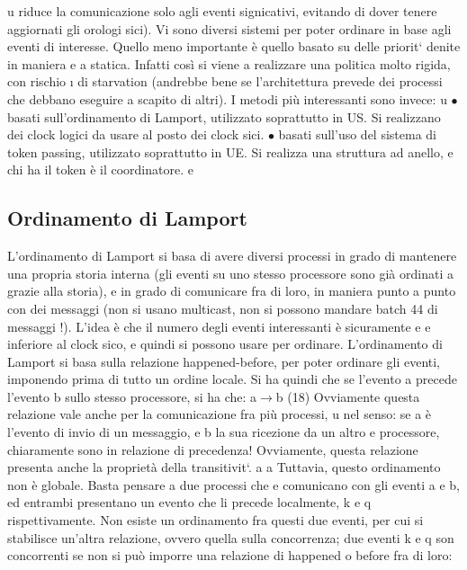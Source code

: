 \documentclass[a4paper,12pt]{article}
\begin{document}
u
riduce la comunicazione solo agli eventi signicativi, evitando di dover tenere
aggiornati gli orologi sici).
Vi sono diversi sistemi per poter ordinare in base agli eventi di interesse.
Quello meno importante è quello basato su delle priorit` denite in maniera
e
a
statica. Infatti così si viene a realizzare una politica molto rigida, con rischio
\i{}
di starvation (andrebbe bene se l'architettura prevede dei processi che debbano
eseguire a scapito di altri).
I metodi più interessanti sono invece:
u
$\bullet$ basati sull'ordinamento di Lamport, utilizzato soprattutto in US. Si realizzano dei clock logici da usare al
posto dei clock sici.
$\bullet$ basati sull'uso del sistema di token passing, utilizzato soprattutto in UE.
Si realizza una struttura ad anello, e chi ha il token è il coordinatore.
e
\subsection{Ordinamento di Lamport}
L'ordinamento di Lamport si basa di avere diversi processi in grado di mantenere
una propria storia interna (gli eventi su uno stesso processore sono già ordinati
a
grazie alla storia), e in grado di comunicare fra di loro, in maniera punto a
punto con dei messaggi (non si usano multicast, non si possono mandare batch
44
di messaggi !). L'idea è che il numero degli eventi interessanti è sicuramente
e
e
inferiore al clock sico, e quindi si possono usare per ordinare.
L'ordinamento di Lamport si basa sulla relazione happened-before, per poter
ordinare gli eventi, imponendo prima di tutto un ordine locale. Si ha quindi che
se l'evento a precede l'evento b sullo stesso processore, si ha che:
a$\rightarrow$b
(18)
Ovviamente questa relazione vale anche per la comunicazione fra più processi,
u
nel senso: se a è l'evento di invio di un messaggio, e b la sua ricezione da un altro
e
processore, chiaramente sono in relazione di precedenza! Ovviamente, questa
relazione presenta anche la proprietà della transitivit`.
a
a
Tuttavia, questo ordinamento non è globale. Basta pensare a due processi che
e
comunicano con gli eventi a e b, ed entrambi presentano un evento che li precede
localmente, k e q rispettivamente. Non esiste un ordinamento fra questi due
eventi, per cui si stabilisce un'altra relazione, ovvero quella sulla concorrenza;
due eventi k e q son concorrenti se non si può imporre una relazione di happened
o
before fra di loro:
\end{document}
